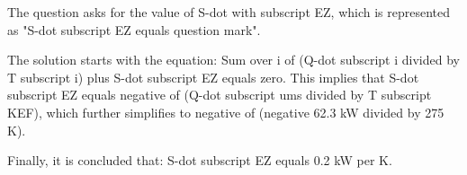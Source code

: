 The question asks for the value of S-dot with subscript EZ, which is represented as "S-dot subscript EZ equals question mark".

The solution starts with the equation:
Sum over i of (Q-dot subscript i divided by T subscript i) plus S-dot subscript EZ equals zero. This implies that S-dot subscript EZ equals negative of (Q-dot subscript ums divided by T subscript KEF), which further simplifies to negative of (negative 62.3 kW divided by 275 K).

Finally, it is concluded that:
S-dot subscript EZ equals 0.2 kW per K.